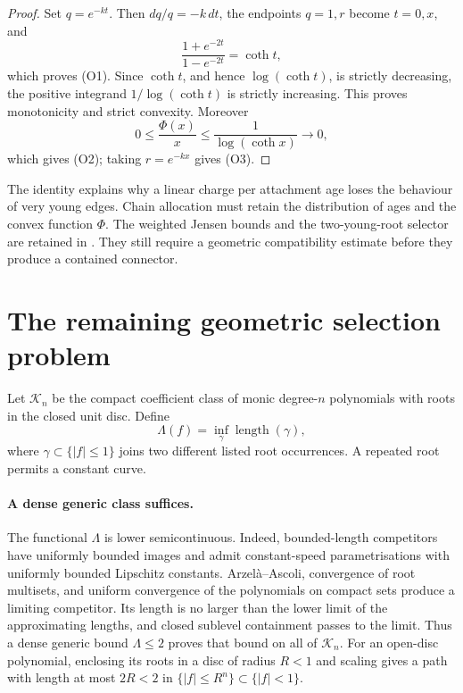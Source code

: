 \documentclass[11pt]{article}
\begin{document}
\begin{proof}
Set $q=e^{-kt}$.  Then $dq/q=-k\,dt$, the endpoints $q=1,r$ become
$t=0,x$, and
\[
 \frac{1+e^{-2t}}{1-e^{-2t}}=\coth t,
\]
which proves (O1).  Since $\coth t$, and hence $\log(\coth t)$, is strictly
decreasing, the positive integrand $1/\log(\coth t)$ is strictly increasing.
This proves monotonicity and strict convexity.  Moreover
\[
 0\le\frac{\Phi(x)}x\le\frac1{\log(\coth x)}\longrightarrow0,
\]
which gives (O2); taking $r=e^{-kx}$ gives (O3).
\end{proof}


The identity explains why a linear charge per attachment age loses the
behaviour of very young edges.  Chain allocation must retain the distribution
of ages and the convex function $\Phi$.  The weighted Jensen bounds and the
two-young-root selector are retained in
.
They still require a geometric compatibility estimate before they produce a
contained connector.

\section{The remaining geometric selection problem}\label{sec:open}

Let $\mathcal K_n$ be the compact coefficient class of monic degree-$n$
polynomials with roots in the closed unit disc.  Define
\[
 \Lambda(f)=\inf_\gamma\operatorname{length}(\gamma),
\]
where $\gamma\subset\{|f|\le1\}$ joins two different listed root
occurrences.  A repeated root permits a constant curve.

\paragraph{A dense generic class suffices.}
The functional $\Lambda$ is lower semicontinuous.  Indeed, bounded-length
competitors have uniformly bounded images and admit constant-speed
parametrisations with uniformly bounded Lipschitz constants.  Arzel\`a--Ascoli,
convergence of root multisets, and uniform convergence of the polynomials on
compact sets produce a limiting competitor.  Its length is no larger than
the lower limit of the approximating lengths, and closed sublevel containment
passes to the limit.  Thus a dense generic bound $\Lambda\le2$ proves that
bound on all of $\mathcal K_n$.  For an open-disc polynomial, enclosing its
roots in a disc of radius $R<1$ and scaling gives a path with length at most
$2R<2$ in $\{|f|\le R^n\}\subset\{|f|<1\}$.
\end{document}
